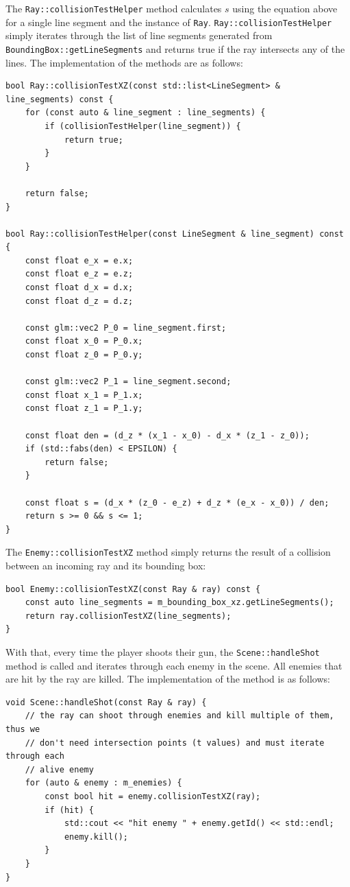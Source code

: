 \documentclass {article}
\begin{document}
The \texttt{Ray::collisionTestHelper} method calculates $s$ using the equation above for a single line segment and the instance of \texttt{Ray}. \texttt{Ray::collisionTestHelper} simply iterates through the list of line segments generated from \texttt{BoundingBox::getLineSegments} and returns true if the ray intersects any of the lines. The implementation of the methods are as follows:
\begin{verbatim}
bool Ray::collisionTestXZ(const std::list<LineSegment> & line_segments) const {
    for (const auto & line_segment : line_segments) {
        if (collisionTestHelper(line_segment)) {
            return true;
        }
    }

    return false;
}

bool Ray::collisionTestHelper(const LineSegment & line_segment) const {
    const float e_x = e.x;
    const float e_z = e.z;
    const float d_x = d.x;
    const float d_z = d.z;

    const glm::vec2 P_0 = line_segment.first;
    const float x_0 = P_0.x;
    const float z_0 = P_0.y;

    const glm::vec2 P_1 = line_segment.second;
    const float x_1 = P_1.x;
    const float z_1 = P_1.y;

    const float den = (d_z * (x_1 - x_0) - d_x * (z_1 - z_0));
    if (std::fabs(den) < EPSILON) {
        return false;
    }

    const float s = (d_x * (z_0 - e_z) + d_z * (e_x - x_0)) / den;
    return s >= 0 && s <= 1;
}
\end{verbatim}

The \texttt{Enemy::collisionTestXZ} method simply returns the result of a collision between an incoming ray and its bounding box:
\begin{verbatim}
bool Enemy::collisionTestXZ(const Ray & ray) const {
    const auto line_segments = m_bounding_box_xz.getLineSegments();
    return ray.collisionTestXZ(line_segments);
}
\end{verbatim}

With that, every time the player shoots their gun, the \texttt{Scene::handleShot} method is called and iterates through each enemy in the scene. All enemies that are hit by the ray are killed. The implementation of the method is as follows:
\begin{verbatim}
void Scene::handleShot(const Ray & ray) {
    // the ray can shoot through enemies and kill multiple of them, thus we
    // don't need intersection points (t values) and must iterate through each
    // alive enemy
    for (auto & enemy : m_enemies) {
        const bool hit = enemy.collisionTestXZ(ray);
        if (hit) {
            std::cout << "hit enemy " + enemy.getId() << std::endl;
            enemy.kill();
        }
    }
}
\end{verbatim}
\end{document}
